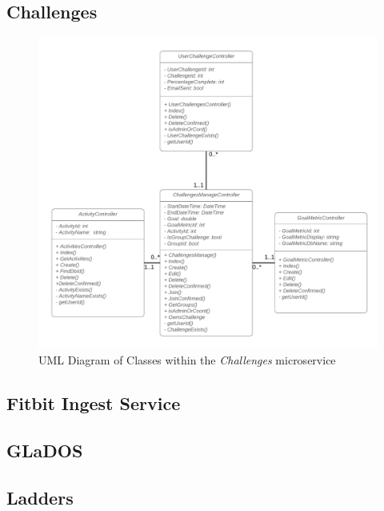 \begin{landscape}
\subsection{Challenges}
\begin{figure}[H]
    \centering
    \includegraphics[width=\textwidth]{Images/class_uml/challenges.png}
    \caption{UML Diagram of Classes within the \textit{Challenges} microservice}
    \label{fig:class_uml:challenges}
\end{figure}
\end{landscape}
\subsection{Fitbit Ingest Service}
\label{fig:class_uml:fitbit-ingest-service}

\subsection{GLaDOS}
\label{fig:class_uml:glados}

\subsection{Ladders}
\label{fig:class_uml:ladders}




\setchapterheaderfooter{} 
\renewcommand{\headrulewidth}{0.4pt}
